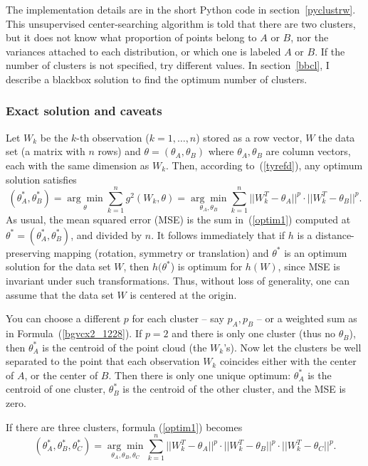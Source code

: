 \documentclass[oneside,10pt]{book}
\begin{document}
The implementation details are in the short
 Python code in section~\ref{pyclustrw}.  This unsupervised center-searching algorithm is told that there are two clusters, but it does not know what proportion of points belong to $A$ or $B$, nor the variances attached to
 each distribution, or which one is labeled $A$ or $B$. If the number of clusters is not specified, try different values. In section~\ref{bbcl}, I describe
 a blackbox solution to find the optimum number of clusters.

\subsubsection{Exact solution and caveats}\label{exact5}

Let $W_k$ be the $k$-th observation ($k=1,\dots,n$) stored as a row vector, $W$ the data set (a matrix with $n$ rows) and $\theta=(\theta_A,\theta_B)$ where $\theta_A,\theta_B$ are column vectors, each with the same dimension as $W_k$. Then, according to~(\ref{tyrefd}),  any optimum solution satisfies
\begin{equation}
(\theta_A^*,\theta_B^*) = \underset{\theta}{\arg\min} \sum_{k=1}^n g^2(W_k,\theta)= \underset{\theta_A,\theta_B}{\arg\min} \sum_{k=1}^n ||W_k^T-\theta_A||^{p} \cdot ||W_k^T-\theta_B||^{p}. \label{optim1}
\end{equation}
 As usual, the \textcolor{index}{mean squared error} (MSE) is the sum in~(\ref{optim1}) computed at $\theta^*=(\theta_A^*,\theta_B^*)$, and divided by $n$.
It follows immediately that if $h$ is a distance-preserving mapping (rotation, symmetry or translation) and $\theta^*$ is an optimum solution for the data set $W$, then $h(\theta^*$) is optimum for $h(W)$, since MSE is invariant under such transformations. Thus, without loss of generality, one can assume that the data set $W$ is centered at the origin.

You can choose a different $p$ for each cluster -- say $p_A,p_B$ -- or a weighted sum as in Formula~(\ref{bgvcx2_1228}).
If $p=2$ and there is only one cluster (thus no $\theta_B$), then $\theta_A^*$ is the centroid of the point
 cloud (the $W_k$'s). Now let the clusters be well separated to the point that each observation $W_k$ coincides either with the center of $A$, or the center of $B$.
Then there is only one unique optimum: $\theta_A^*$ is the centroid of one cluster, $\theta_B^*$ is the centroid of the other cluster, and the MSE is zero.

If there are three clusters, formula (\ref{optim1})  becomes
\begin{equation}
(\theta_A^*,\theta_B^*,\theta_C^*) = \underset{\theta_A,\theta_B,\theta_C}{\arg\min} \sum_{k=1}^n ||W_k^T-\theta_A||^{p} \cdot ||W_k^T-\theta_B||^{p} \cdot ||W_k^T-\theta_C||^{p}. \label{optim2}
\end{equation}
\end{document}
